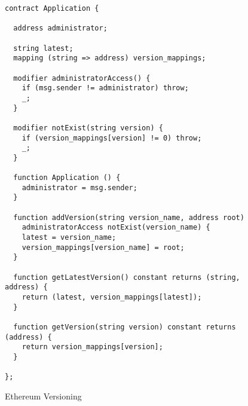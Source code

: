 \begin{figure}[H]
  \centering
  \begin{verbatim}
contract Application {

  address administrator;

  string latest;
  mapping (string => address) version_mappings;

  modifier administratorAccess() {
    if (msg.sender != administrator) throw;
    _;
  }

  modifier notExist(string version) {
    if (version_mappings[version] != 0) throw;
    _;
  }

  function Application () {
    administrator = msg.sender;
  }

  function addVersion(string version_name, address root)
    administratorAccess notExist(version_name) {
    latest = version_name;
    version_mappings[version_name] = root;
  }

  function getLatestVersion() constant returns (string, address) {
    return (latest, version_mappings[latest]);
  }

  function getVersion(string version) constant returns (address) {
    return version_mappings[version];
  }

};
  \end{verbatim}
  \caption{Ethereum Versioning}
  \label{code:ethereum_versioning}
\end{figure}
